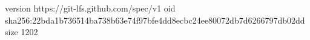 version https://git-lfs.github.com/spec/v1
oid sha256:22bda1b736514ba738b63e74f97bfe4dd8ecbc24ee80072db7d6266797db02dd
size 1202
